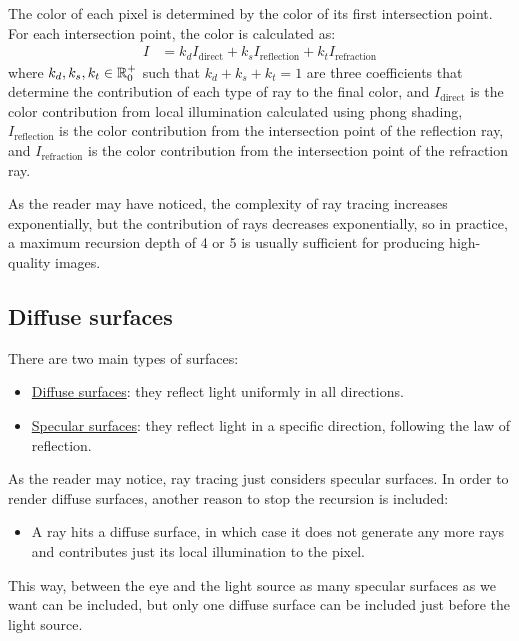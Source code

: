 The color of each pixel is determined by the color of its first intersection point. For each intersection point, the color is calculated as:
\begin{align*}
    I  &= k_d I_{\text{direct}} + k_s I_{\text{reflection}} + k_t I_{\text{refraction}}
\end{align*}
where $k_d, k_s, k_t\in \mathbb{R}^+_0$ such that $k_d + k_s + k_t = 1$ are three coefficients that determine the contribution of each type of ray to the final color, and $I_{\text{direct}}$ is the color contribution from local illumination calculated using phong shading, $I_{\text{reflection}}$ is the color contribution from the intersection point of the reflection ray, and $I_{\text{refraction}}$ is the color contribution from the intersection point of the refraction ray.
\begin{observacion}
    As the reader may have noticed, the complexity of ray tracing increases exponentially, but the contribution of rays decreases exponentially, so in practice, a maximum recursion depth of 4 or 5 is usually sufficient for producing high-quality images.
\end{observacion}



\subsection{Diffuse surfaces}


There are two main types of surfaces:
\begin{itemize}
    \item \ul{Diffuse surfaces}: they reflect light uniformly in all directions.
    \item \ul{Specular surfaces}: they reflect light in a specific direction, following the law of reflection.
\end{itemize}

As the reader may notice, ray tracing just considers specular surfaces. In order to render diffuse surfaces, another reason to stop the recursion is included:
\begin{itemize}
    \item A ray hits a diffuse surface, in which case it does not generate any more rays and contributes just its local illumination to the pixel.
\end{itemize}

This way, between the eye and the light source as many specular surfaces as we want can be included, but only one diffuse surface can be included just before the light source.

